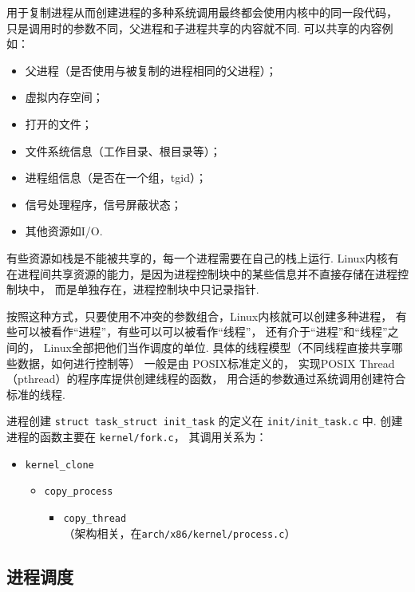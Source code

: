 用于复制进程从而创建进程的多种系统调用最终都会使用内核中的同一段代码，
只是调用时的参数不同，父进程和子进程共享的内容就不同.
可以共享的内容例如：
\begin{itemize}
	\item 父进程（是否使用与被复制的进程相同的父进程）；
	\item 虚拟内存空间；
	\item 打开的文件；
	\item 文件系统信息（工作目录、根目录等）；
	\item 进程组信息（是否在一个组，tgid）；
	\item 信号处理程序，信号屏蔽状态；
	\item 其他资源如I/O.
\end{itemize}
有些资源如栈是不能被共享的，每一个进程需要在自己的栈上运行.
Linux内核有在进程间共享资源的能力，是因为进程控制块中的某些信息并不直接存储在进程控制块中，
而是单独存在，进程控制块中只记录指针.\cite{silberschatz2021operating}

按照这种方式，只要使用不冲突的参数组合，Linux内核就可以创建多种进程，
有些可以被看作“进程”，有些可以可以被看作“线程”，
还有介于“进程”和“线程”之间的，
Linux全部把他们当作调度的单位.
具体的线程模型（不同线程直接共享哪些数据，如何进行控制等）
一般是由 POSIX标准\cite{pthread}定义的，
实现POSIX Thread （pthread）的程序库提供创建线程的函数，
用合适的参数通过系统调用创建符合标准的线程.

\begin{readsrcbox}{进程创建}
	\lstinline{struct task_struct init_task}
	的定义在 \lstinline{init/init_task.c} 中.
	创建进程的函数主要在 \lstinline{kernel/fork.c}，
	其调用关系为：
	\begin{itemize}
		\item \lstinline{kernel_clone}
		      \begin{itemize}
			      \item \lstinline{copy_process}
			            \begin{itemize}
				            \item \lstinline{copy_thread} \\
				                  （架构相关，在\lstinline{arch/x86/kernel/process.c}）
			            \end{itemize}
		      \end{itemize}
	\end{itemize}
\end{readsrcbox}

\subsection{进程调度} \label{scheduling} 
